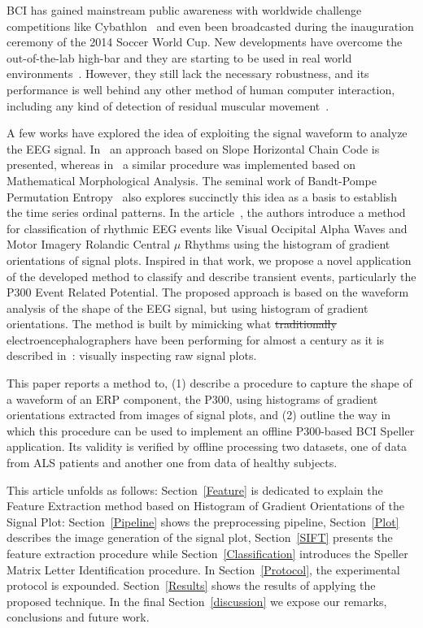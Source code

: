\documentclass[utf8]{frontiersSCNS} %
\providecommand{\DIFaddtex}[1]{{\protect\color{blue}\uwave{#1}}} %
\providecommand{\DIFdeltex}[1]{{\protect\color{red}\sout{#1}}}                      %
\providecommand{\DIFaddbegin}{} %
\providecommand{\DIFaddend}{} %
\providecommand{\DIFdelbegin}{} %
\providecommand{\DIFdelend}{} %
\providecommand{\DIFadd}[1]{\texorpdfstring{\DIFaddtex{#1}}{#1}} %
\providecommand{\DIFdel}[1]{\texorpdfstring{\DIFdeltex{#1}}{}} %
\begin{document}
BCI has gained mainstream public awareness with worldwide challenge competitions like Cybathlon~\citep{Riener2014,cybathlon2} and even been broadcasted during the inauguration ceremony of the 2014 Soccer World Cup.  New developments have overcome the out-of-the-lab high-bar and they are starting to be used in real world environments~\citep{Guger2017,Huggins2016}.  However, they still lack the necessary robustness, and its performance is well behind any other method of human computer interaction, including any kind of detection of residual muscular movement~\citep{Clerc}.

A few works have explored the idea of exploiting the signal waveform to analyze the EEG signal.  In~\citep{Alvarado-Gonzalez2016} an approach based on Slope Horizontal Chain Code is presented, whereas in~\citep{Yamaguchi2009} a similar procedure was implemented based on Mathematical Morphological Analysis.  The seminal work of Bandt-Pompe Permutation Entropy~\citep{Berger2017} also explores succinctly this idea as a basis to establish the time series ordinal patterns.  In the article~\citep{Ramele2016},  the authors introduce a method for classification of rhythmic EEG events like Visual Occipital Alpha Waves  and Motor Imagery Rolandic Central $\mu$ Rhythms using the histogram of gradient orientations of signal plots.  Inspired in that work, we propose a novel application of the developed method to classify and describe transient events, particularly the P300 Event Related Potential.  
The proposed approach is based on the waveform analysis of the shape of the EEG signal, but using histogram of gradient orientations. The method is built by mimicking what \DIFdelbegin \DIFdel{traditionally }\DIFdelend \DIFaddbegin \DIFadd{regularly }\DIFaddend electroencephalographers have been performing for almost a century as it is described in~\citep{Hartman2005}: visually inspecting raw signal plots.

This paper reports a method to, (1) describe a procedure to capture the shape of a waveform of an ERP component, the P300, using histograms of gradient orientations extracted from images of signal plots, and (2) outline the way in which this procedure can be used to implement an offline P300-based BCI Speller application. Its validity is verified by offline processing two datasets, one of data from ALS patients and another one from data of healthy subjects. 

This article unfolds as follows: Section~\ref{Feature} is dedicated to explain the Feature Extraction method based on Histogram of Gradient Orientations of the Signal Plot: Section~\ref{Pipeline} shows the preprocessing pipeline,  Section~\ref{Plot}  describes the image generation of the signal plot, Section~\ref{SIFT}  presents the feature extraction procedure while  Section~\ref{Classification}  introduces the Speller Matrix Letter Identification procedure.  In Section~\ref{Protocol}, the experimental protocol is expounded. Section~\ref{Results} shows the results of applying the proposed technique.  In the final Section~\ref{discussion}  we expose our remarks, conclusions and future work.
\end{document}
